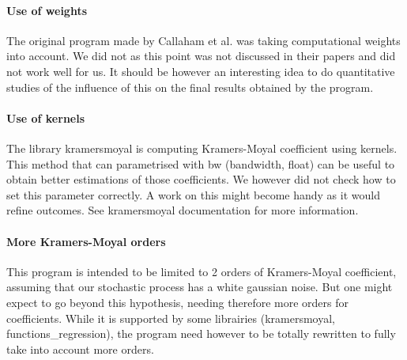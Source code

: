 \documentclass[A4paper]{article}
\begin{document}
\paragraph{Use of weights}
The original program made by Callaham et al. was taking computational weights into account. We did not as this point was not discussed in their papers and did not work well for us. It should be however an interesting idea to do quantitative studies of the influence of this on the final results obtained by the program.

\paragraph{Use of kernels}
The library kramersmoyal is computing Kramers-Moyal coefficient using kernels. This method that can parametrised with bw (bandwidth, float) can be useful to obtain better estimations of those coefficients. We however did not check how to set this parameter correctly. A work on this might become handy as it would refine outcomes. See kramersmoyal documentation for more information.

\paragraph{More Kramers-Moyal orders}
This program is intended to be limited to 2 orders of Kramers-Moyal coefficient, assuming that our stochastic process has a white gaussian noise. But one might expect to go beyond this hypothesis, needing therefore more orders for coefficients. While it is supported by some librairies (kramersmoyal, functions\_regression), the program need however to be totally rewritten to fully take into account more orders.


\newpage

{}
\end{document}
